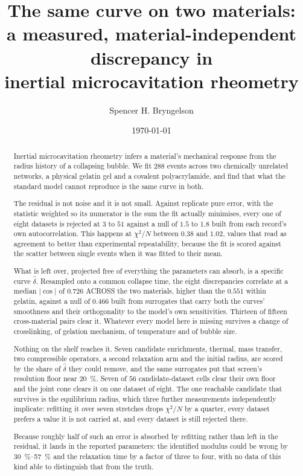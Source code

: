 \documentclass[10pt]{article}
\title{The same curve on two materials:\\
a measured, material-independent discrepancy in\\
inertial microcavitation rheometry}
\author{Spencer H. Bryngelson}
\date{\today}
\begin{document}
\maketitle

\begin{abstract}
Inertial microcavitation rheometry infers a material's mechanical response from the radius
history of a collapsing bubble. We fit $288$ events across two chemically unrelated networks, a
physical gelatin gel and a covalent polyacrylamide, and find that what the standard model cannot
reproduce is the same curve in both.

The residual is not noise and it is not small. Against replicate pure error, with the statistic
weighted so its numerator is the sum the fit actually minimises, every one of eight datasets is
rejected at $3$ to $51$ against a null of $1.5$ to $1.8$ built from each record's own
autocorrelation. This happens at $\chi^2/N$ between $0.38$ and $1.02$, values that read as
agreement to better than experimental repeatability, because the fit is scored against the
scatter between single events when it was fitted to their mean.

What is left over, projected free of everything the parameters can absorb, is a specific curve
$\hat\delta$. Resampled onto a common collapse time, the eight discrepancies correlate at a
median $\lvert\cos\rvert$ of $0.726$ ACROSS the two materials, higher than the $0.551$ within
gelatin, against a null of $0.466$ built from surrogates that carry both the curves' smoothness
and their orthogonality to the model's own sensitivities. Thirteen of fifteen cross-material
pairs clear it. Whatever every model here is missing survives a change of crosslinking, of
gelation mechanism, of temperature and of bubble size.

Nothing on the shelf reaches it. Seven candidate enrichments, thermal, mass transfer, two
compressible operators, a second relaxation arm and the initial radius, are scored by the share
of $\hat\delta$ they could remove, and the same surrogates put that screen's resolution floor
near \SI{20}{\percent}. Seven of $56$ candidate-dataset cells clear their own floor and the joint
cone clears it on one dataset of eight. The one reachable candidate that survives is the
equilibrium radius, which three further measurements independently implicate: refitting it over
seven stretches drops $\chi^2/N$ by a quarter, every dataset prefers a value it is not carried
at, and every dataset is still rejected there.

Because roughly half of such an error is absorbed by refitting rather than left in the residual,
it lands in the reported parameters: the identified modulus could be wrong by
\SIrange{30}{57}{\percent} and the relaxation time by a factor of three to four, with no data of
this kind able to distinguish that from the truth.


\end{abstract}
\end{document}
